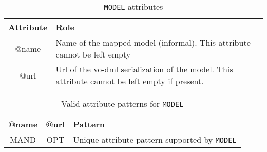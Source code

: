 \begin{table}[!htbp]
\small
\centering
\begin{tabulary}{\linewidth}{|c|J|}       
       \hline 
            \textbf{Attribute} & 
            \textbf {Role}\\
       \hline         \hline  
            @name  & 
            Name of the mapped model (informal).  This attribute cannot be left empty  \\
       \hline 
            @url & 
            Url of the vo-dml serialization of the model. This attribute cannot be left empty if present.\\
       \hline 
     \end{tabulary}
     \caption{\texttt{MODEL} attributes} 
     \label{tbl:model-att}
 \end{table}


\begin{table}[!htbp]
\small
\centering
\begin{tabulary}{\linewidth}{|c |c |J|}
    \hline 
        \textbf{@name} &
        \textbf{@url} &
        \textbf{Pattern}\\
    \hline      \hline  
        MAND &           
        OPT &           
        Unique attribute pattern supported by \texttt{MODEL}\\
   \hline 
\end{tabulary}
     \caption{Valid attribute patterns for  \texttt{MODEL}} 
     \label{tbl:model-pattern}
 \end{table}